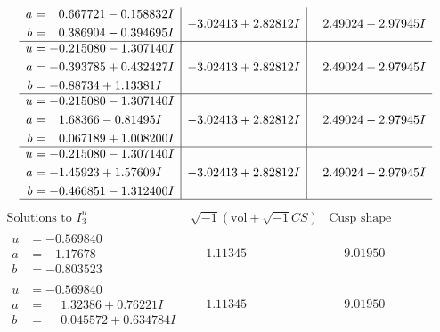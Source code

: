 \documentclass[1p]{elsarticle_modified}
\theoremstyle{definition}
\newcommand{\I}{\sqrt{-1}}
\begin{document}
$$\begin{array}{c|c|c}
\begin{aligned}
a &= \phantom{-}0.667721 - 0.158832 I \\
b &= \phantom{-}0.386904 - 0.394695 I\end{aligned}
 & -3.02413 + 2.82812 I & \phantom{-}2.49024 - 2.97945 I \\ \hline\begin{aligned}
u &= -0.215080 - 1.307140 I \\
a &= -0.393785 + 0.432427 I \\
b &= -0.88734 + 1.13381 I\end{aligned}
 & -3.02413 + 2.82812 I & \phantom{-}2.49024 - 2.97945 I \\ \hline\begin{aligned}
u &= -0.215080 - 1.307140 I \\
a &= \phantom{-}1.68366 - 0.81495 I \\
b &= \phantom{-}0.067189 + 1.008200 I\end{aligned}
 & -3.02413 + 2.82812 I & \phantom{-}2.49024 - 2.97945 I \\ \hline\begin{aligned}
u &= -0.215080 - 1.307140 I \\
a &= -1.45923 + 1.57609 I \\
b &= -0.466851 - 1.312400 I\end{aligned}
 & -3.02413 + 2.82812 I & \phantom{-}2.49024 - 2.97945 I\\
 \hline 
 \end{array}$$\newpage$$\begin{array}{c|c|c}  
\text{Solutions to }I^u_{3}& \I (\text{vol} + \sqrt{-1}CS) & \text{Cusp shape}\\
 \hline 
\begin{aligned}
u &= -0.569840\phantom{ +0.000000I} \\
a &= -1.17678\phantom{ +0.000000I} \\
b &= -0.803523\phantom{ +0.000000I}\end{aligned}
 & \phantom{-}1.11345\phantom{ +0.000000I} & \phantom{-}9.01950\phantom{ +0.000000I} \\ \hline\begin{aligned}
u &= -0.569840\phantom{ +0.000000I} \\
a &= \phantom{-}1.32386 + 0.76221 I \\
b &= \phantom{-}0.045572 + 0.634784 I\end{aligned}
 & \phantom{-}1.11345\phantom{ +0.000000I} & \phantom{-}9.01950\phantom{ +0.000000I} \\ \hline\begin{aligned}

\end{aligned}
\end{array}$$
\end{document}
